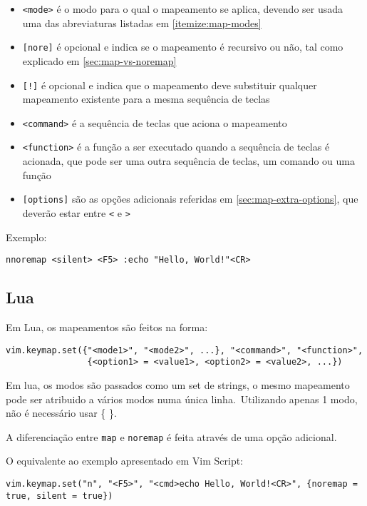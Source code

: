 \begin{itemize}
    \setlength{\itemsep}{-5pt} %
    \item \texttt{<mode>} é o modo para o qual o mapeamento se aplica, devendo ser usada uma das abreviaturas listadas em \ref{itemize:map-modes}
    \item \texttt{[nore]} é opcional e indica se o mapeamento é recursivo ou não, tal como explicado em \ref{sec:map-vs-noremap}
    \item \texttt{[!]} é opcional e indica que o mapeamento deve substituir qualquer mapeamento existente para a mesma sequência de teclas
    \item \texttt{<command>} é a sequência de teclas que aciona o mapeamento
    \item \texttt{<function>} é a função a ser executado quando a sequência de teclas é acionada, que pode ser uma outra sequência de teclas, um comando ou uma função
    \item \texttt{[options]} são as opções adicionais referidas em \ref{sec:map-extra-options}, que deverão estar entre \texttt{<} e \texttt{>}
\end{itemize}

Exemplo:

\begin{lstlisting}
nnoremap <silent> <F5> :echo "Hello, World!"<CR>
\end{lstlisting}

\subsection{Lua}

Em Lua, os mapeamentos são feitos na forma:

\begin{lstlisting}
vim.keymap.set({"<mode1>", "<mode2>", ...}, "<command>", "<function>",
                {<option1> = <value1>, <option2> = <value2>, ...})
\end{lstlisting}

Em lua, os modos são passados como um set de strings, o mesmo mapeamento pode ser atribuido a vários modos numa única linha.\ Utilizando apenas 1 modo, não é necessário usar \{ \}.

A diferenciação entre \texttt{map} e \texttt{noremap} é feita através de uma opção adicional.

O equivalente ao exemplo apresentado em Vim Script:

\begin{lstlisting}
vim.keymap.set("n", "<F5>", "<cmd>echo Hello, World!<CR>", {noremap = true, silent = true})
\end{lstlisting}

